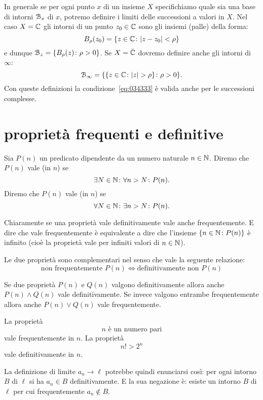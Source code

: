 In generale se per ogni punto $x$ di un insieme $X$ specifichiamo quale
sia una base di intorni $\mathcal B_x$ di $x$, potremo definire i limiti delle successioni
a valori in $X$.
Nel caso $X=\mathbb C$ gli intorni di un punto $z_0\in \mathbb C$ sono gli insiemi
(palle) della forma:
\[
  B_\rho(z_0) = \{z\in \mathbb C \colon {\left|z-z_0\right|}<\rho\}
\]
e dunque $\mathcal B_{z} = \{B_\rho(z)\colon \rho>0\}$. Se $X=\bar {\mathbb C}$ dovremo
definire anche gli intorni di $\infty$:
\[
  \mathcal B_\infty = \{ \{z\in \mathbb C\colon {\left|z\right|}>\rho\} \colon \rho>0\}.
\]
Con queste definizioni la condizione~\eqref{eq:034333} è valida
anche per le successioni complesse.

\section{proprietà frequenti e definitive}
\begin{definition}
Sia $P(n)$ un predicato dipendente da un numero naturale $n\in \mathbb N$.
Diremo che $P(n)$ vale  (in $n$) se
\[
  \exists N\in \mathbb N \colon \forall n>N\colon P(n).
\]
Diremo che $P(n)$ vale  (in $n$) se
\[
  \forall N\in \mathbb N \colon \exists n>N \colon P(n).
\]
\end{definition}

Chiaramente se una proprietà vale definitivamente vale anche frequentemente.
E dire che vale frequentemente è equivalente a dire che
l'insieme $\{n\in \mathbb N\colon P(n)\}$ è infinito (cioè la proprietà vale per infiniti
valori di $n\in \mathbb N$).

Le due proprietà sono complementari nel senso che vale la seguente
relazione:
\[
  \text{non frequentemente $P(n)$} \iff
  \text{definitivamente non $P(n)$}
\]

Se due proprietà $P(n)$ e $Q(n)$ valgono definitivamente allora anche
$P(n)\land Q(n)$ vale definitivamente. Se invece valgono entrambe
frequentemente allora anche $P(n) \lor Q(n)$ vale frequentemente.

\begin{example}
La proprietà
\[
  \text{$n$ è un numero pari}
\]
vale frequentemente in $n$. La proprietà
\[
 \text{$n! > 2^n$}
\]
vale definitivamente in $n$.
\end{example}

La definizione di limite $a_n \to \ell$ potrebbe quindi enunciarsi così:
per ogni intorno $B$ di $\ell$ si ha $a_n\in B$ definitivamente.
E la sua negazione è: esiste un intorno $B$ di $\ell$ per cui
frequentemente $a_n\not\in B$.

